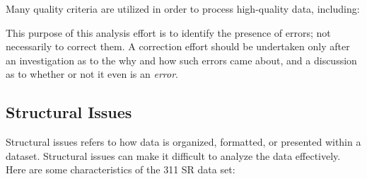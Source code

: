 \documentclass[12pt, titlepage]{article}
\begin{document}
Many quality criteria are utilized in order to process high-quality 
data, including:

This purpose of this analysis effort is to identify the presence of 
errors; not necessarily to correct them. A correction effort should
be undertaken only after an investigation as to the why and how 
such errors came about, and a discussion as to whether or not it 
even is an \textit{error}. 


\subsection{Structural Issues}
\label{sec:structural}
Structural issues refers to how data is organized, formatted, 
or presented within a dataset. Structural issues can make 
it difficult to analyze the data effectively. Here are some 
characteristics of the 311 SR data set:
\end{document}
